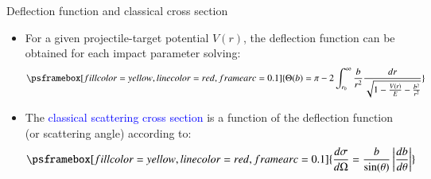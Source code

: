 \documentclass[english,10pt]{beamer}
\newcommand{\bi}{\begin{itemize}}
\newcommand{\ei}{\end{itemize}}
\begin{document}
\begin{frame}

\end{frame}



\begin{frame}{Deflection function and classical cross section}


\bi
\item For a given projectile-target potential $V(r)$, the deflection function can be obtained for  each impact parameter solving:
$$
\psframebox[fillcolor=yellow,linecolor=red,framearc=0.1]{
\nonumber
\Theta(b) = \pi -2 \int_{r_0}^{\infty} \frac{b}{r^2}\frac{dr}{\sqrt{1 - \frac{V(r)}{E} - \frac{b^2}{r^2}}}
}%
$$


\item The \textcolor{blue}{classical scattering cross section} is a function of the deflection function (or scattering angle) according to: 
$$
\psframebox[fillcolor=yellow,linecolor=red,framearc=0.1]{
\frac{d\sigma}{d\Omega} 
= \frac{b}{\sin(\theta)}\left|\frac{db}{d\theta}\right|
}%
$$

\ei


\end{frame}
\end{document}
